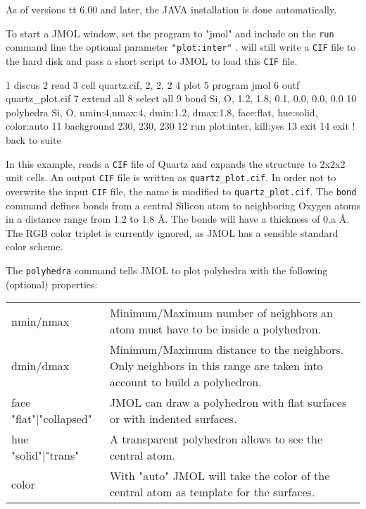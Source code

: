 As of versions {tt 6.00} and later, the JAVA installation is done
automatically.

To start a JMOL window, set the program to "jmol" and include 
on the {\tt run} command line
the optional parameter {\tt "plot:inter"} 
. \Discus will still write a {\tt CIF} file to 
the hard disk and pass a short script to JMOL to load this {\tt CIF} file.

\begin{MacVerbatim}
 1  discus
 2  read
 3    cell quartz.cif, 2, 2, 2
 4  plot
 5    program   jmol
 6    outf      quartz_plot.cif
 7    extend    all
 8    select    all
 9    bond      Si, O, 1.2, 1.8, 0.1, 0.0, 0.0, 0.0
10    polyhedra Si, O, nmin:4,nmax:4, dmin:1.2, dmax:1.8, face:flat, hue:solid, color:auto
11    background 230, 230, 230
12    run plot:inter, kill:yes
13  exit
14  exit  ! back to suite
\end{MacVerbatim}

In this example, \Discus reads a {\tt CIF} file of Quartz and expands the 
structure to 2x2x2 unit cells. An output {\tt CIF} file is written as
{\tt quartz\_plot.cif}. In order not to overwrite the input {\tt CIF} file,
the name is modified to {\tt quartz\_plot.cif}. The {\tt bond} command
defines bonds from a central Silicon atom to neighboring Oxygen atoms
in a distance range from 1.2 to 1.8 \AA{}. The bonds will have a thickness
of 0.a \AA. The RGB color triplet is currently ignored, as JMOL has a
sensible standard color scheme. 

The {\tt polyhedra} command tells JMOL to plot polyhedra with the 
following (optional) properties:

\begin{tabularx}{\textwidth}{p{40mm}X}
nmin/nmax & Minimum/Maximum number of neighbors an atom must have to 
      be inside a polyhedron.  \\
dmin/dmax & Minimum/Maximum distance to the neighbors. Only neighbors
      in this range are taken into account to build a polyhedron. \\
face {"flat"|"collapsed"} & JMOL can draw a polyhedron with flat surfaces 
      or with indented surfaces. \\
hue {"solid"|"trans"} & A transparent polyhedron allows to see the 
      central atom. \\
color & With "auto" JMOL will take the color of the central atom 
      as template for the surfaces. \\
\end{tabularx}

